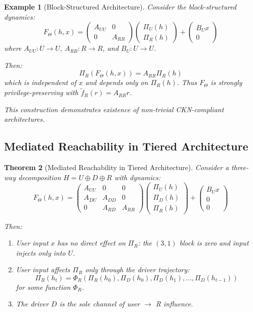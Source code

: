 \documentclass[11pt,a4paper]{article}
\newtheorem{theorem}{Theorem}[section]
\newtheorem{example}[theorem]{Example}
\begin{document}
\begin{example}[Block-Structured Architecture]
\label{ex:block-structure}
Consider the block-structured dynamics:
\[
F_\Theta(h, x) = 
\begin{pmatrix}
A_{UU} & 0 \\
0 & A_{RR}
\end{pmatrix}
\begin{pmatrix}
\Pi_U(h) \\
\Pi_R(h)
\end{pmatrix}
+
\begin{pmatrix}
B_U x \\
0
\end{pmatrix}
\]
where $A_{UU}: U \to U$, $A_{RR}: R \to R$, and $B_U: U \to U$.

Then:
\[
\Pi_R(F_\Theta(h, x)) = A_{RR} \Pi_R(h)
\]
which is independent of $x$ and depends only on $\Pi_R(h)$. Thus $F_\Theta$ is strongly privilege-preserving with $\tilde{f}_R(r) = A_{RR} r$.

This construction demonstrates existence of non-trivial CKN-compliant architectures.
\end{example}

\subsection{Mediated Reachability in Tiered Architecture}

\begin{theorem}[Mediated Reachability in Tiered Architecture]
\label{thm:mediated-reachability}
Consider a three-way decomposition $H = U \oplus D \oplus R$ with dynamics:
\[
F_\Theta(h, x) = 
\begin{pmatrix}
A_{UU} & 0 & 0 \\
A_{DU} & A_{DD} & 0 \\
0 & A_{RD} & A_{RR}
\end{pmatrix}
\begin{pmatrix}
\Pi_U(h) \\
\Pi_D(h) \\
\Pi_R(h)
\end{pmatrix}
+
\begin{pmatrix}
B_U x \\
0 \\
0
\end{pmatrix}
\]

Then:
\begin{enumerate}
    \item User input $x$ has no direct effect on $\Pi_R$: the $(3,1)$ block is zero and input injects only into $U$.
    \item User input affects $\Pi_R$ only through the driver trajectory: 
    \[
    \Pi_R(h_t) = \Phi_R(\Pi_R(h_0), \Pi_D(h_0), \Pi_D(h_1), \ldots, \Pi_D(h_{t-1}))
    \]
    for some function $\Phi_R$.
    \item The driver $D$ is the sole channel of user $\to$ R influence.
\end{enumerate}
\end{theorem}
\end{document}
